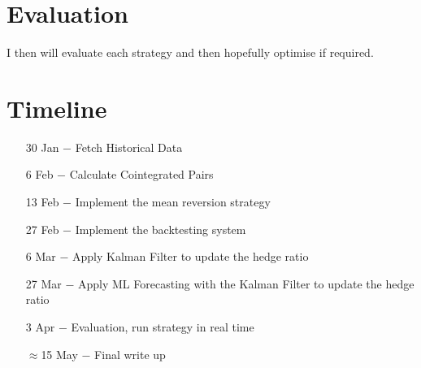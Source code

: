 \section{Evaluation}
I then will evaluate each strategy and then hopefully optimise if required.

\section{Timeline}

\begin{enumerate}
    \item[30 Jan $-$] Fetch Historical Data
    \item[6 Feb $-$] Calculate Cointegrated Pairs
    \item[13 Feb $-$] Implement the mean reversion strategy
    \item[27 Feb $-$] Implement the backtesting system
    \item[6 Mar $-$] Apply Kalman Filter to update the hedge ratio
    \item[27 Mar $-$] Apply ML Forecasting with the Kalman Filter to update the hedge ratio
    \item[3 Apr $-$] Evaluation, run strategy in real time
    \item[$\approx$15 May $-$] Final write up 
\end{enumerate}

